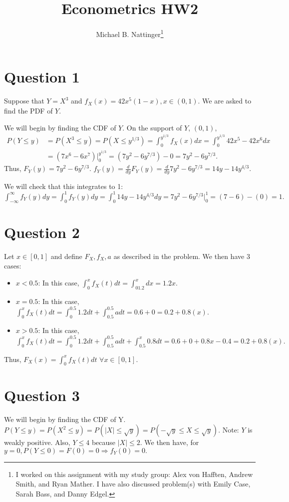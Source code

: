 \documentclass[11pt]{article} %
\title{Econometrics HW2}
\author{Michael B. Nattinger\footnote{I worked on this assignment with my study group: Alex von Hafften, Andrew Smith, and Ryan Mather. I have also discussed problem(s) with Emily Case, Sarah Bass, and Danny Edgel.}}
\begin{document}
\maketitle

\section{Question 1}
Suppose that $Y = X^{3}$ and $f_X(x) = 42x^5(1-x), x \in (0,1).$ We are asked to find the PDF of $Y$.

We will begin by finding the CDF of $Y$. On the support of $Y$, $(0,1)$,
\begin{align*}
P(Y\leq y) &= P(X^{3} \leq y) = P(X \leq y^{1/3}) = \int_0^{y^{1/3}} f_X(x)dx =  \int_0^{y^{1/3}}42x^5 - 42x^6dx \\
&= (7x^6 - 6x^7)|^{y^{1/3}}_{0} = (7y^2 - 6y^{7/3}) - 0 = 7y^2 - 6y^{7/3}.
\end{align*}
Thus, $F_Y(y) =  7y^2 - 6y^{7/3}$. $f_Y(y) = \frac{d}{dy} F_Y(y) =  \frac{d}{dy} 7y^2 - 6y^{7/3} = 14y - 14y^{4/3}$.

We will check that this integrates to 1:
$\int_{-\infty}^{\infty} f_Y(y)dy = \int_0^1f_Y(y)dy =  \int_0^1 14y - 14y^{4/3} dy = 7y^2 - 6y^{7/3}|_0^1 =  (7 - 6) - (0) = 1. $

\section{Question 2}
Let $x \in [0,1]$ and define $F_X,f_X,a$ as described in the problem. We then have 3 cases:

\begin{itemize}
\item $x<0.5$: In this case, $\int^{x}_0 f_X(t)dt = \int^{x}_01.2 dx = 1.2x.$
\item $x=0.5$: In this case,  $\int^{x}_0 f_X(t)dt = \int^{0.5}_0 1.2dt + \int^{0.5}_{0.5} a dt = 0.6 + 0 = 0.2+0.8(x).$
\item $x>0.5$: In this case,  $\int^{x}_0 f_X(t)dt = \int^{0.5}_0 1.2dt + \int^{0.5}_{0.5} a dt + \int^{x}_{0.5} 0.8 dt = 0.6 + 0 + 0.8x - 0.4 = 0.2+0.8(x).$
\end{itemize}

Thus, $F_X(x) = \int_0^x f_X(t)dt$ $\forall x \in [0,1].$

\section{Question 3}
We will begin by finding the CDF of Y. $P(Y\leq y) = P(X^2 \leq y) = P(|X| \leq \sqrt{y}) = P(-\sqrt{y}\leq X \leq \sqrt{y})$. Note: $Y$ is weakly positive. Also, $Y\leq 4$ because $|X| \leq 2. $ We then have, for $y=0, P(Y\leq 0) = F(0) = 0 \Rightarrow f_Y(0) = 0.$
\end{document}

